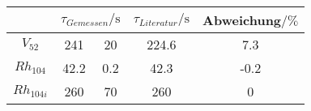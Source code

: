 \label{tab:tabFehler}
	\begin{tabular}{cc @{${}\pm{}$} ccS[table-format=1.1]}
		\toprule
		{} &   & {$\tau_{Literatur}/\si{\second}$} & {Abweichung$/\% $}\\
		\midrule
		$V_{52}$	& 241		& 20	& 224.6	& 7.3 \\
		$Rh_{104}$	& 42.2	& 0.2	& 42.3	& -0.2 \\
		$Rh_{104i}$	& 260 		& 70	& 260		& 0 \\
		\bottomrule
	\end{tabular}
